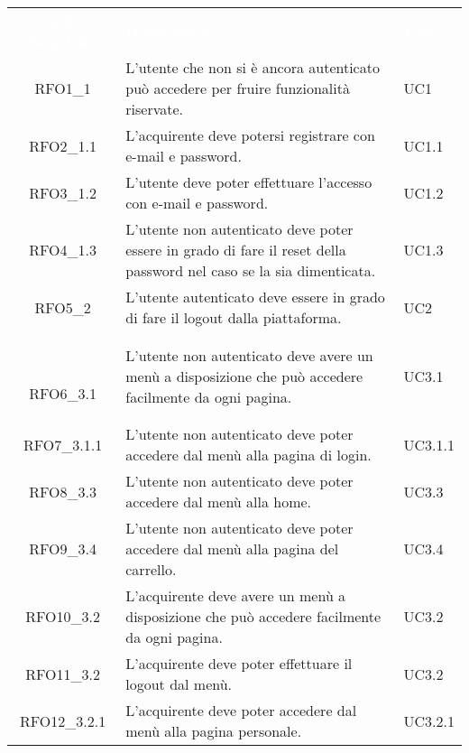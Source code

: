 \renewcommand{\arraystretch}{1.5}
\begin{longtable}{|c C{9.5cm} C{2.5cm}|} 

	\textcolor{white}{\textbf{Codice Requisito}}&
	\textcolor{white}{\textbf{Descrizione}}&
	\textcolor{white}{\textbf{Fonte}}\\	
	
	RFO1\_1& L'utente che non si è ancora autenticato può accedere per fruire funzionalità riservate. & UC1 \\
	
	RFO2\_1.1 & L'acquirente deve potersi registrare con e-mail e password. & UC1.1 \\
	
	RFO3\_1.2 & L'utente deve poter effettuare l'accesso con e-mail e password. & UC1.2 \\
	
	RFO4\_1.3 & L'utente non autenticato deve poter essere in grado di fare il reset della password nel caso se la sia dimenticata. & UC1.3 \\
	
	RFO5\_2 & L'utente autenticato deve essere in grado di fare il logout dalla piattaforma. & UC2 \\\

	RFO6\_3.1 & L'utente non autenticato deve avere un menù a disposizione che può accedere facilmente da ogni pagina. & UC3.1 \\
	
	RFO7\_3.1.1 & L'utente non autenticato deve poter accedere dal menù alla pagina di login. & UC3.1.1 \\

	RFO8\_3.3 & L'utente non autenticato deve poter accedere dal menù alla home. & UC3.3 \\

	RFO9\_3.4 & L'utente non autenticato deve poter accedere dal menù alla pagina del carrello. & UC3.4 \\

	RFO10\_3.2 & L'acquirente deve avere un menù a disposizione che può accedere facilmente da ogni pagina. & UC3.2 \\
	
	RFO11\_3.2 & L'acquirente deve poter effettuare il logout dal menù. & UC3.2 \\
	
	RFO12\_3.2.1 & L'acquirente deve poter accedere dal menù alla pagina personale. & UC3.2.1 \\


\end{longtable}
